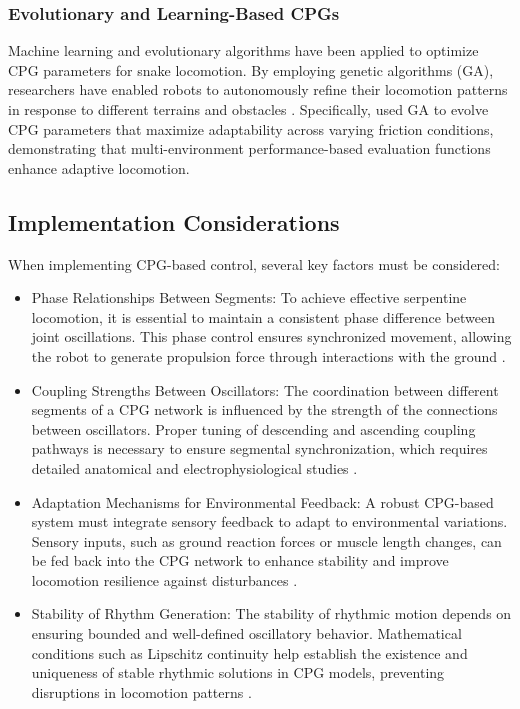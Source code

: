 \documentclass[12pt,a4paper]{report}
\begin{document}
\subsubsection{Evolutionary and Learning-Based CPGs}
Machine learning and evolutionary algorithms have been applied to optimize CPG parameters for snake locomotion. By employing genetic algorithms (GA), researchers have enabled robots to autonomously refine their locomotion patterns in response to different terrains and obstacles \cite{Inoue2007}. Specifically, \textcite{Inoue2007} used GA to evolve CPG parameters that maximize adaptability across varying friction conditions, demonstrating that multi-environment performance-based evaluation functions enhance adaptive locomotion.

\subsection{Implementation Considerations}
When implementing CPG-based control, several key factors must be considered:
\begin{itemize}
    \item Phase Relationships Between Segments: To achieve effective serpentine locomotion, it is essential to maintain a consistent phase difference between joint oscillations. This phase control ensures synchronized movement, allowing the robot to generate propulsion force through interactions with the ground \cite{Norzalilah2014}.
    \item Coupling Strengths Between Oscillators: The coordination between different segments of a CPG network is influenced by the strength of the connections between oscillators. Proper tuning of descending and ascending coupling pathways is necessary to ensure segmental synchronization, which requires detailed anatomical and electrophysiological studies \cite{MARDER2001R986}.
    \item Adaptation Mechanisms for Environmental Feedback: A robust CPG-based system must integrate sensory feedback to adapt to environmental variations. Sensory inputs, such as ground reaction forces or muscle length changes, can be fed back into the CPG network to enhance stability and improve locomotion resilience against disturbances \cite{Inoue2007}.
    \item Stability of Rhythm Generation: The stability of rhythmic motion depends on ensuring bounded and well-defined oscillatory behavior. Mathematical conditions such as Lipschitz continuity help establish the existence and uniqueness of stable rhythmic solutions in CPG models, preventing disruptions in locomotion patterns \cite{Zhenli2006}.
\end{itemize}
\end{document}

